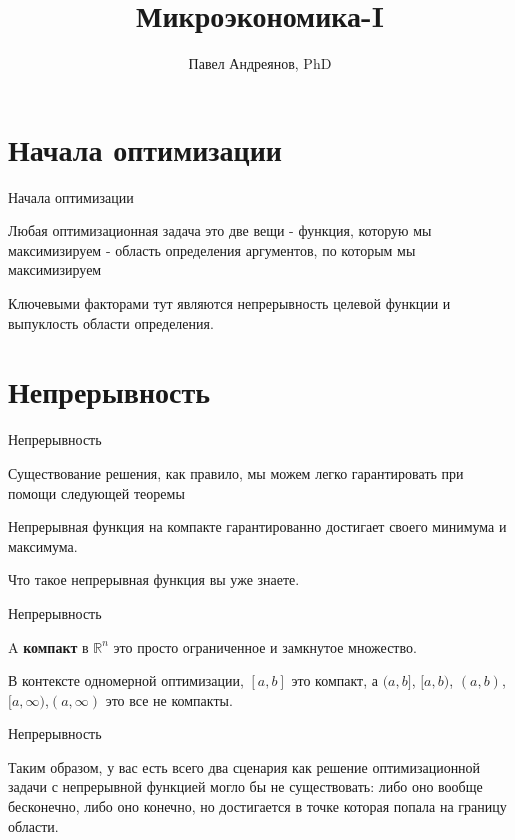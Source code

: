 \documentclass{beamer}
\title{
Микроэкономика-I
}
\author{
Павел Андреянов, PhD
}
\begin{document}
\maketitle

\section{Начала оптимизации}

\begin{frame}{Начала оптимизации}

Любая оптимизационная задача это две вещи
- функция, которую мы максимизируем
- область определения аргументов, по которым мы максимизируем

Ключевыми факторами тут являются непрерывность целевой функции и выпуклость области определения.

\end{frame}

\section{Непрерывность}

\begin{frame}{Непрерывность}

Существование решения, как правило, мы можем легко гарантировать при помощи следующей теоремы

\begin{theorem}[Вейерштрасса]

Непрерывная функция на компакте гарантированно достигает своего минимума и максимума.
\end{theorem}

Что такое непрерывная функция вы уже знаете.

\end{frame}

\begin{frame}{Непрерывность}

A \textbf{компакт} в $\mathbb{R}^n$ это просто ограниченное и замкнутое множество. 

В контексте одномерной оптимизации, $[a,b]$ это компакт, а $(a,b]$, $[a,b)$, $(a,b)$, $[a,\infty)$,$(a,\infty)$ это все не компакты. 

\end{frame}

\begin{frame}{Непрерывность}

Таким образом, у вас есть всего два сценария как решение оптимизационной задачи с непрерывной функцией могло бы не существовать: либо оно вообще бесконечно, либо оно конечно, но достигается в точке которая попала на границу области.

\end{frame}
\end{document}
